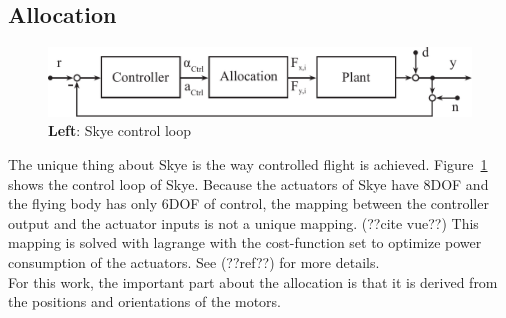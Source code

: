 \subsection{Allocation}

\begin{figure}[hbtp]
\label{fig:system_loop_3}
\centering
\includegraphics[width=.9\linewidth]{images/system_loop_3.pdf}
\caption{\textbf{Left}: Skye control loop}
\end{figure}

The unique thing about Skye is the way controlled flight is achieved. 
Figure~\ref{fig:system_loop_3} shows the control loop of Skye.
Because the actuators of Skye have 8DOF and the flying body has only 6DOF of control, the mapping between the controller output and the actuator inputs is not a unique mapping. (??cite vue??)
This mapping is solved with lagrange with the cost-function set to optimize power consumption of the actuators. See (??ref??) for more details.\\
For this work, the important part about the allocation is that it is derived from the positions and orientations of the motors.

